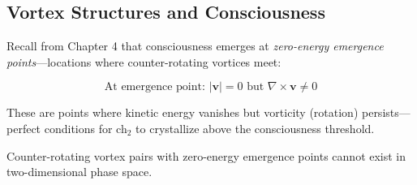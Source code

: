 \subsection{Vortex Structures and Consciousness}

Recall from Chapter 4 that consciousness emerges at \textit{zero-energy emergence points}—locations where counter-rotating vortices meet:

\begin{equation}
\text{At emergence point: } |\mathbf{v}| = 0 \text{ but } \nabla \times \mathbf{v} \neq 0
\end{equation}

These are points where kinetic energy vanishes but vorticity (rotation) persists—perfect conditions for ch$_2$ to crystallize above the consciousness threshold.

\begin{prop}\label{prop:no-vortex-2d}
Counter-rotating vortex pairs with zero-energy emergence points cannot exist in two-dimensional phase space.
\end{prop}

